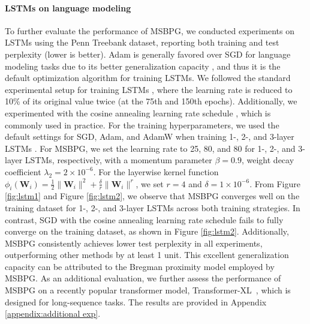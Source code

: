 \documentclass[twoside,11pt]{article}
\def\mW{{\bm{W}}}
\begin{document}
\paragraph{LSTMs on language modeling}
To further evaluate the performance of MSBPG, we conducted experiments on LSTMs using the Penn Treebank dataset, reporting both training and test perplexity (lower is better). Adam is generally favored over SGD for language modeling tasks due to its better generalization capacity \citep{fu2016using, siami2019performance}, and thus it is the default optimization algorithm for training LSTMs. We followed the standard experimental setup for training LSTMs \citep{zhuang2020adabelief, chen2021closing}, where the learning rate is reduced to 10\%  of its original value twice (at the 75th and 150th epochs). Additionally, we experimented with the cosine annealing learning rate schedule \citep{loshchilov2016sgdr}, which is commonly used in practice. For the training hyperparameters, we used the default settings for SGD, Adam, and AdamW when training 1-, 2-, and 3-layer LSTMs \citep{zhuang2020adabelief, chen2021closing}. For MSBPG, we set the learning rate to 25, 80, and 80 for 1-, 2-, and 3-layer LSTMs, respectively, with a momentum parameter $\beta=0.9$, weight decay coefficient $\lambda_2=2\times 10^{-6}$. For the layerwise kernel function $\phi_i({\mW}_i)=\frac{1}{2}\|{\mW}_i\|^2+\frac{\delta}{r}\|{\mW}_i\|^{r}$, we set $r=4$ and $\delta=1\times 10^{-6}$. From Figure \ref{fig:lstm1} and Figure \ref{fig:lstm2}, we observe that MSBPG converges well on the training dataset for 1-, 2-, and 3-layer LSTMs across both training strategies. In contrast, SGD with the cosine annealing learning rate schedule fails to fully converge on the training dataset, as shown in Figure \ref{fig:lstm2}. Additionally, MSBPG consistently achieves lower test perplexity in all experiments, outperforming other methods by at least 1 unit. This excellent generalization capacity can be attributed to the Bregman proximity model employed by MSBPG. {As an additional evaluation, we further assess the performance of MSBPG on a recently popular transformer model, Transformer-XL~\citep{dai2019transformer}, which is designed for long-sequence tasks. The results are provided in Appendix \ref{appendix:additional exp}.}
\end{document}
